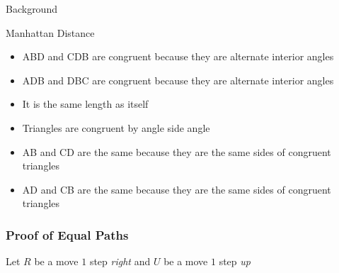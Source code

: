 \documentclass{beamer}
\theoremstyle{case}
\begin{document}
\begin{section}{Background}
\begin{subsection}{Manhattan Distance}
\begin{frame}
{\begin{itemize}
            \item ABD and CDB are congruent because they are alternate interior angles
            \item ADB and DBC are congruent because they are alternate interior angles
            \item It is the same length as itself
            \item Triangles are congruent by angle side angle
            \item AB and CD are the same because they are the same sides of congruent triangles
            \item AD and CB are the same because they are the same sides of congruent triangles
        \end{itemize}
    }
\end{frame}

\begin{frame}
    \frametitle{Proof of Equal Paths}
    Let $R$ be a move $1$ step \textit{right} and $U$ be a move $1$ step \textit{up}
\end{frame}

\end{subsection} %


\end{section}
\end{document}

